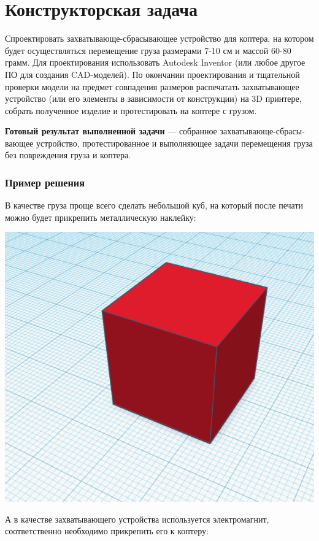 \section{Конструкторская задача}

Спроектировать захватывающе-сбрасывающее устройство для коптера, на котором будет осуществляться перемещение груза размерами 7-10 см и массой 60-80 грамм. Для проектирования использовать Autodesk Inventor (или любое другое ПО для создания CAD-моделей). По окончании проектирования и тщательной проверки модели на предмет совпадения размеров распечатать захватывающее устройство (или его элементы в зависимости от конструкции) на 3D принтере, собрать полученное изделие и протестировать на коптере с грузом. 

\textbf{Готовый результат выполненной задачи} — собранное захватывающе-сбрасы-вающее устройство, протестированное и выполняющее задачи перемещения груза без повреждения груза и коптера.  

\subsubsection*{Пример решения}

В качестве груза проще всего сделать небольшой куб, на который после печати можно будет прикрепить металлическую наклейку:

\includegraphics[width=15cm]{final/command_tour/ats/task_09/1.png}

А в качестве захватывающего устройства используется электромагнит, соответственно необходимо прикрепить его к коптеру:


